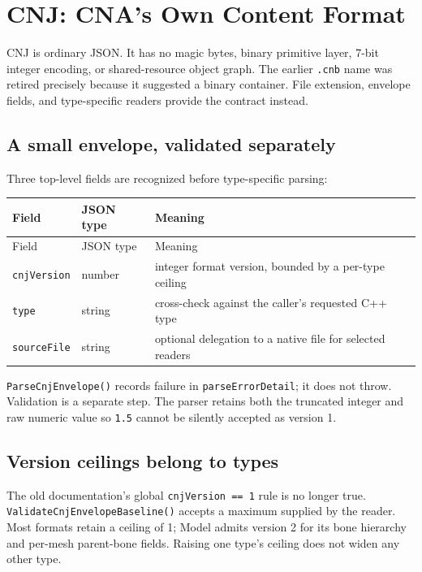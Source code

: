 \chapter{CNJ: CNA's Own Content Format}
\label{ch:cnj-format}
\label{sec:cnj}

CNJ is ordinary JSON.  It has no magic bytes, binary primitive layer, 7-bit integer encoding,
or shared-resource object graph.  The earlier \texttt{.cnb} name was retired precisely because
it suggested a binary container.  File extension, envelope fields, and type-specific readers
provide the contract instead.



\section{A small envelope, validated separately}

Three top-level fields are recognized before type-specific parsing:

\begin{longtable}{p{}p{}p{}}
\toprule
Field & JSON type & Meaning \\
\midrule
\endfirsthead
\toprule
Field & JSON type & Meaning \\
\midrule
\endhead
\texttt{cnjVersion} & number & integer format version, bounded by a per-type ceiling \\
\texttt{type} & string & cross-check against the caller's requested C++ type \\
\texttt{sourceFile} & string & optional delegation to a native file for selected readers \\
\bottomrule
\end{longtable}

\texttt{ParseCnjEnvelope()} records failure in \texttt{parseErrorDetail}; it does not throw.
Validation is a separate step.  The parser retains both the truncated integer and raw numeric
value so \texttt{1.5} cannot be silently accepted as version 1.

\section{Version ceilings belong to types}

The old documentation's global \texttt{cnjVersion == 1} rule is no longer true.
\texttt{ValidateCnjEnvelopeBaseline()} accepts a maximum supplied by the reader.  Most formats
retain a ceiling of 1; Model admits version 2 for its bone hierarchy and per-mesh parent-bone
fields.  Raising one type's ceiling does not widen any other type.

